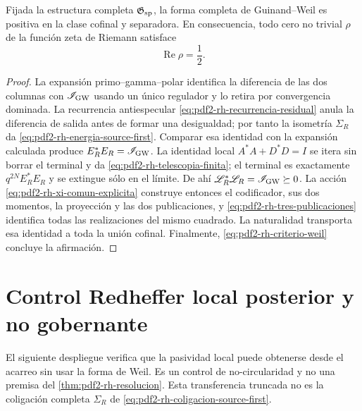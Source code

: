 \begin{theorem}
\label{thm:pdf2-rh-resolucion}
Fijada la estructura completa
\(\mathfrak G_{\rm sp}\), la forma
completa de Guinand--Weil es positiva en la clase cofinal y separadora. En
consecuencia, todo cero no trivial \(\rho\) de la función zeta de Riemann
satisface
\[
 \boxed{\operatorname{Re}\rho=\frac12.}
\]
\end{theorem}

\begin{proof}
La expansión primo--gamma--polar identifica la diferencia de las dos columnas
con \(\mathscr I_{\rm GW}\) usando un único regulador y lo retira por
convergencia dominada. La recurrencia antiespecular
\eqref{eq:pdf2-rh-recurrencia-residual} anula la diferencia de salida antes de
formar una desigualdad; por tanto la isometría \(\Sigma_R\) da
\eqref{eq:pdf2-rh-energia-source-first}. Comparar esa identidad con la
expansión calculada produce
\(E_R^*E_R=\mathscr I_{\rm GW}\). La identidad local
\(A^*A+D^*D=I\) se itera sin borrar el terminal y da
\eqref{eq:pdf2-rh-telescopia-finita}; el terminal es exactamente
\(q^{2N}E_R^*E_R\) y se extingue sólo en el límite. De ahí
\(\mathscr L_R^*\mathscr L_R=\mathscr I_{\rm GW}\succeq0\).
La acción
\eqref{eq:pdf2-rh-xi-comun-explicita} construye entonces el codificador, sus
dos momentos, la proyección y las dos publicaciones, y
\eqref{eq:pdf2-rh-tres-publicaciones} identifica todas las realizaciones del
mismo cuadrado. La naturalidad transporta esa identidad a toda la unión
cofinal. Finalmente,
\eqref{eq:pdf2-rh-criterio-weil} concluye la afirmación.
\end{proof}

\section{Control Redheffer local posterior y no gobernante}

El siguiente despliegue verifica que la pasividad local puede obtenerse desde
el acarreo sin usar la forma de Weil. Es un control de no-circularidad y no una
premisa del \cref{thm:pdf2-rh-resolucion}. Esta transferencia truncada no es
la coligación completa \(\Sigma_R\) de
\eqref{eq:pdf2-rh-coligacion-source-first}.

